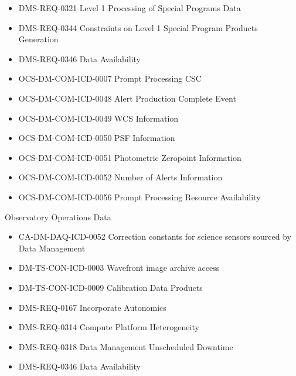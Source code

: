 \begin{itemize}
\item DMS-REQ-0321 Level 1 Processing of Special Programs Data
\item DMS-REQ-0344 Constraints on Level 1 Special Program Products Generation
\item DMS-REQ-0346 Data Availability
\item OCS-DM-COM-ICD-0007 Prompt Processing CSC
\item OCS-DM-COM-ICD-0048 Alert Production Complete Event
\item OCS-DM-COM-ICD-0049 WCS Information
\item OCS-DM-COM-ICD-0050 PSF Information
\item OCS-DM-COM-ICD-0051 Photometric Zeropoint Information
\item OCS-DM-COM-ICD-0052 Number of Alerts Information
\item OCS-DM-COM-ICD-0056 Prompt Processing Resource Availability
\end{itemize}
Observatory Operations Data \begin{itemize}
\item CA-DM-DAQ-ICD-0052 Correction constants for science sensors sourced by Data Management
\item DM-TS-CON-ICD-0003 Wavefront image archive access
\item DM-TS-CON-ICD-0009 Calibration Data Products
\item DMS-REQ-0167 Incorporate Autonomics
\item DMS-REQ-0314 Compute Platform Heterogeneity
\item DMS-REQ-0318 Data Management Unscheduled Downtime
\item DMS-REQ-0346 Data Availability
\end{itemize}
